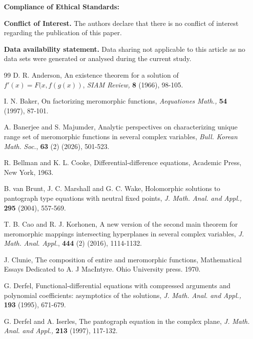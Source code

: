 \documentclass[11pt,reqno]{amsart}
\numberwithin{equation}{section}
\begin{document}
\vspace{0.1in}
{\bf Compliance of Ethical Standards:}\par

{\bf Conflict of Interest.} The authors declare that there is no conflict of interest regarding the publication of this paper.\par

{\bf Data availability statement.} Data sharing not applicable to this article as no data sets were generated or analysed during the current study.


\begin{thebibliography}{99}
 {\sc D. R. Anderson}, An existence theorem for a solution of $f'(x) = F(x, f(g(x))$, \textit{SIAM Review,} \textbf{8} (1966), 98-105.

 {\sc I. N. Baker}, On factorizing meromorphic functions, \textit{Aequationes Math.,} \textbf{54} (1997), 87-101.

 {\sc A. Banerjee} and {\sc S. Majumder}, Analytic perspectives on characterizing unique range set of meromorphic functions in several complex variables, \textit{Bull. Korean Math. Soc.}, \textbf{63} (2) (2026), 501-523.

 {\sc R. Bellman} and {\sc K. L. Cooke}, Differential-difference equations, Academic Press, New York, 1963.	

 {\sc B. van Brunt}, {\sc J. C. Marshall} and {\sc G. C. Wake}, Holomorphic solutions to pantograph type equations with neutral fixed points, \textit{J. Math. Anal. and Appl.,} \textbf{295} (2004), 557-569.

 {\sc T. B. Cao} and {\sc R. J. Korhonen}, A new version of the second main theorem for meromorphic mappings intersecting hyperplanes in several complex variables, \textit{J. Math. Anal. Appl.}, \textbf{444} (2) (2016), 1114-1132.

 {\sc J. Clunie}, The composition of entire and meromorphic functions, Mathematical Essays Dedicated to A. J MacIntyre. Ohio University press. 1970.

 {\sc G. Derfel}, Functional-differential equations with compressed arguments and polynomial coefficients: asymptotics of the solutions, \textit{J. Math. Anal. and Appl.,} \textbf{193} (1995), 671-679.

 {\sc G. Derfel} and {\sc A. Iserles}, The pantograph equation in the complex plane, \textit{J. Math. Anal. and Appl.,} \textbf{213} (1997), 117-132.


\end{thebibliography}
\end{document}
